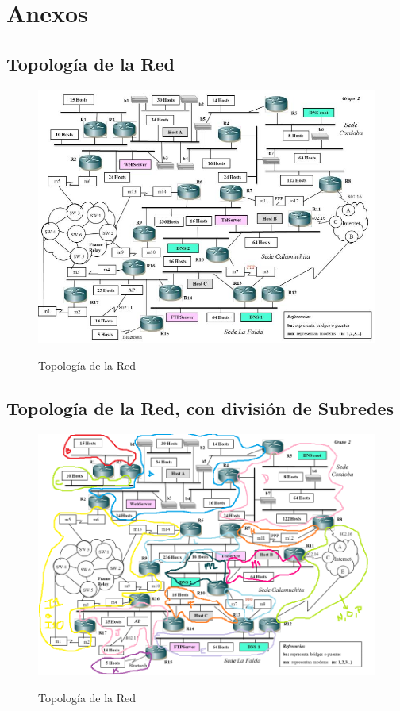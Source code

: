 \section{Anexos}
\subsection{Topología de la Red}
\begin{figure}[h!]
\centering
\includegraphics[width=\textwidth]{topologia.jpeg}
\label{topologia}
\caption{Topología de la Red}
\end{figure}

\newpage
\subsection{Topología de la Red, con división de Subredes}
\begin{figure}[h!]
\centering
\includegraphics[width=\textwidth]{DivisionRedes.png}
\label{topologia}
\caption{Topología de la Red}
\end{figure}

